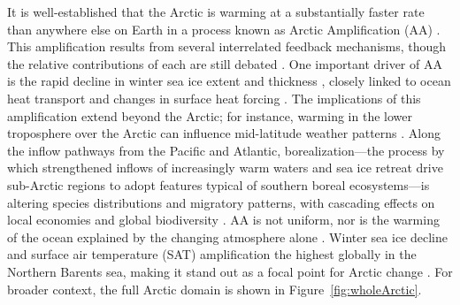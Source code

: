 \documentclass[draft]{agujournal2019}
\begin{document}
It is well-established that the Arctic is warming at a substantially faster rate than anywhere else on Earth in a process known as Arctic Amplification (AA) \cite{Manabe1980,Serreze2009,Cosimo2014,Huang2017,Rantanen2022}. This amplification results from several interrelated feedback mechanisms, though the relative contributions of each are still debated \cite{Pithan2014,Timmermans2018,Gong2017,Pistone2019,Previdi2021}. One important driver of AA is the rapid decline in winter sea ice extent and thickness \cite{Perovich2009,Dai2019}, closely linked to ocean heat transport and changes in surface heat forcing \cite{Onarheim2018,Stroeve2018,Oldenburg2024}. The implications of this amplification extend beyond the Arctic; for instance, warming in the lower troposphere over the Arctic can influence mid-latitude weather patterns \cite{Honda2009,Petoukhov2010,Francis2012,Cohen2018,Coumou2018}. Along the inflow pathways from the Pacific and Atlantic, borealization—the process by which strengthened inflows of increasingly warm waters and sea ice retreat drive sub-Arctic regions to adopt features typical of southern boreal ecosystems—is altering species distributions and migratory patterns, with cascading effects on local economies and global biodiversity \cite{Fossheim2015,Polyakov2020_borealization,Ingvaldsen2021,Husson2024}. AA is not uniform, nor is the warming of the ocean explained by the changing atmosphere alone \cite{Marshall2014}. Winter sea ice decline and surface air temperature (SAT) amplification the highest globally in the Northern Barents sea, making it stand out as a focal point for Arctic change \cite{Screen2010,Onarheim2017,Isaksen2022,Rantanen2022}. For broader context, the full Arctic domain is shown in Figure~\ref{fig:wholeArctic}.
\end{document}
